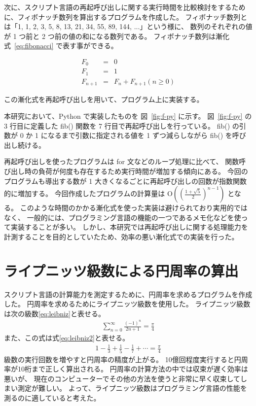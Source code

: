 次に、スクリプト言語の再起呼び出しに関する実行時間を比較検討をするために、フィボナッチ数列を算出するプログラムを作成した。
フィボナッチ数列とは「1, 1, 2, 3, 5, 8, 13, 21, 34, 55, 89, 144, ...」という様に、
数列のそれぞれの値が 1 つ前と 2 つ前の値の和になる数列である。
フィボナッチ数列は漸化式~\ref{eq:fibonacci} で表す事ができる。

\begin{eqnarray}
\label{eq:fibonacci}
  F_{0}&=&0 \nonumber \\
  F_{1}&=&1 \\
  F_{n+1}&=&F_{n}+F_{n+1}(n≥0)\nonumber
\end{eqnarray}

この漸化式を再起呼び出しを用いて、プログラム上に実装する。

本研究において、Python で実装したものを 図~\ref{fig:f-py} に示す。
図~\ref{fig:f-py} の 3 行目に定義した fib() 関数を 7 行目で再起呼び出しを行っている。
fib() の引数が 0 か 1 になるまで引数に指定される値を 1 ずつ減らしながら fib() を呼び出し続ける。

再起呼び出しを使ったプログラムは for 文などのループ処理に比べて、
関数呼び出し時の負荷が何度も存在するため実行時間が増加する傾向にある。
今回のプログラムも導出する数が 1 大きくなるごとに再起呼び出しの回数が指数関数的に増加する。
今回作成したプログラムの計算量は O$((\frac{1 +\sqrt{5}}{2})^{n-1})$ となる。
このような時間のかかる漸化式を使った実装は避けられており実用的ではなく、
一般的には、プログラミング言語の機能の一つであるメモ化などを使って実装することが多い。
しかし、本研究では再起呼び出しに関する処理能力を計測することを目的としていたため、効率の悪い漸化式での実装を行った。

\section{ライプニッツ級数による円周率の算出}
\label{cha:program:leibniz}

スクリプト言語の計算能力を測定するために、円周率を求めるプログラムを作成した。
円周率を求めるためにライプニッツ級数を使用した。
ライプニッツ級数は次の級数\ref{eq:leibniz}と表せる。
\begin{eqnarray} \label{eq:leibniz}
\sum_{n=0}^{\infty}\frac{(-1)^n}{2n+1}=\frac{\pi}{4}
\end{eqnarray}
また、この式は式\ref{eq:leibniz2}と表せる。
\begin{eqnarray} \label{eq:leibniz2}
1-\frac{1}{3}+\frac{1}{5}-\frac{1}{7}+\cdots=\frac{\pi}{4}
\end{eqnarray}
級数の実行回数を増やすと円周率の精度が上がる。
10億回程度実行すると円周率が10桁まで正しく算出される。
円周率の計算方法の中では収束が遅く効率は悪いが、
現在のコンピューターでその他の方法を使うと非常に早く収束してしまい測定が難しい。
よって、ライプニッツ級数はプログラミング言語の性能を測るのに適していると考えた。

